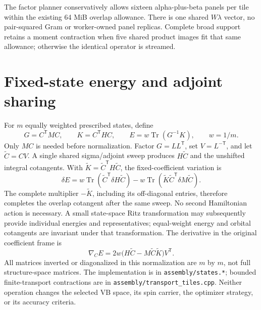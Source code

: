 \documentclass[11pt,a4paper]{article}
\newcommand{\T}{^{\mathsf T}}
\begin{document}
The factor planner conservatively allows sixteen alpha-plus-beta panels per
tile within the existing 64 MiB overlap allowance. There is one shared
$W\lambda$ vector, no pair-squared Gram or worker-owned panel replicas.
Complete broad support retains a moment contraction when five shared product
images fit that same allowance; otherwise the identical operator is streamed.

\section{Fixed-state energy and adjoint sharing}

For $m$ equally weighted prescribed states, define
\begin{equation}
 G=C\T M C,\qquad K=C\T H C,\qquad
 E=w\operatorname{Tr}(G^{-1}K),\qquad w=1/m.
\end{equation}
Only $MC$ is needed before normalization. Factor $G=L L\T$, set
$V=L^{-\mathsf T}$, and let $\widetilde C=CV$. A single shared sigma/adjoint
sweep produces $H\widetilde C$ and the unshifted integral cotangents. With
$\widetilde K=\widetilde C\T H\widetilde C$, the fixed-coefficient variation is
\begin{equation}
 \delta E=w\operatorname{Tr}(\widetilde C\T\delta H\widetilde C)
 -w\operatorname{Tr}(\widetilde K\widetilde C\T\delta M\widetilde C).
\end{equation}
The complete multiplier $-\widetilde K$, including its off-diagonal entries,
therefore completes the overlap cotangent after the same sweep. No second
Hamiltonian action is necessary. A small state-space Ritz transformation may
subsequently provide individual energies and representatives; equal-weight
energy and orbital cotangents are invariant under that transformation.
The derivative in the original coefficient frame is
\begin{equation}
 \nabla_C E=2w\big(H\widetilde C-M\widetilde C\widetilde K\big)V\T.
\end{equation}
All matrices inverted or diagonalized in this normalization are $m$ by $m$,
not full structure-space matrices. The implementation is in
\texttt{assembly/states.*}; bounded finite-transport contractions are in
\texttt{assembly/transport\_tiles.cpp}. Neither operation changes the selected
VB space, its spin carrier, the optimizer strategy, or its accuracy criteria.
\end{document}
